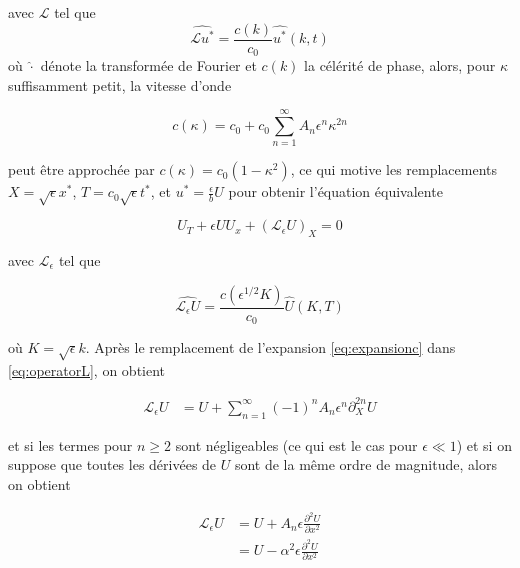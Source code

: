 \noindent avec $\mathcal{L}$ tel que $$ \widehat{\mathcal{L}u^*} = \frac{c(k)}{c_0} \widehat{u^*}(k,t)$$ où $\hat \cdot$ dénote la transformée de Fourier et  $c(k)$ la célérité  de phase, alors, pour $\kappa$ suffisamment petit, la vitesse d'onde

\begin{equation}
\label{eq:expansionc}
c(\kappa) = c_0 + c_0 \sum_{n=1}^{\infty}A_n\epsilon^n\kappa^{2n}
\end{equation}

\noindent peut être approchée par  $c(\kappa) = c_0(1-\kappa^2)$, ce qui motive les remplacements $ X=\sqrt{\epsilon}x^*$, $T =c_0 \sqrt{\epsilon} t^*$, et $u^* = \frac{\epsilon}{ b} U$ pour obtenir l'équation équivalente   





\begin{equation}
\label{eq:scaledEquation}
 U_T + \epsilon U U_x+(\mathcal{L}_{\epsilon} U)_{X} = 0
 \end{equation}

\noindent avec $\mathcal{L}_\epsilon$ tel que 

\begin{equation}
\label{eq:operatorL}
\widehat{\mathcal{L}_\epsilon U} = \frac{c(\epsilon^{1/2} K)}{c_0} \hat{U}(K,T)
\end{equation}

\noindent où $K=\sqrt{\epsilon} k$. Après le remplacement de l'expansion \eqref{eq:expansionc} dans \eqref{eq:operatorL}, on obtient

\begin{align}
  \label{eq:expansionLe}
    \mathcal{L}_\epsilon U &=U +\sum_{n=1}^\infty (-1)^n A_n \epsilon^n \partial_X^{2n} U    
\end{align}

\noindent et si les termes pour $n\geq2$ sont négligeables (ce qui est le cas pour $\epsilon \ll 1 $) et si on suppose que toutes les dérivées de $U$ sont de la même ordre de magnitude, alors on obtient

\begin{align*}
    \mathcal{L}_\epsilon U &= U + A_n \epsilon \frac{\partial^2 U}{\partial x^2} \\
    &= U - \alpha^2 \epsilon \frac{\partial^2 U}{\partial x^2} \\
\end{align*}

